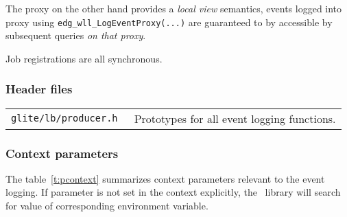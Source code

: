 The \LB proxy on the other hand provides a \emph{local view}
semantics, events logged into proxy using
\verb'edg_wll_LogEventProxy(...)' are guaranteed to by accessible by
subsequent queries \emph{on that proxy}.

Job registrations are all synchronous.

\subsubsection{Header files}

\begin{table}[h]
\begin{tabularx}{\textwidth}{>{\tt}lX}
glite/lb/producer.h & Prototypes for all event logging functions. \\
\end{tabularx}
\end{table}

\subsubsection{Context parameters}
The table~\ref{t:pcontext} summarizes context parameters relevant to the
event logging. If  parameter is not set in the context explicitly, the
\LB\ library will search for value of corresponding environment
variable. 

